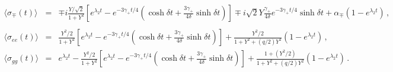 \documentclass[twocolumn,aps,eqsecnum,showkeys,amsmath]{revtex4-2}
\begin{document}
\begin{widetext}
%
%
\begin{subequations} 	\label{eq:BlochSolsApp}
\begin{eqnarray} 	
\langle \sigma_{\mp} (t) \rangle &=& 
	\mp i \frac{ Y/ \sqrt{2} }{1+Y^2}  \left[ e^{\lambda_2 t} 
	 -e^{-3\gamma_+ t/4} \left( \cosh{\delta t}  
	+ \frac{3 \gamma_+}{4 \delta} \sinh{\delta t} \right) \right] 
  \mp i \sqrt{2} Y \frac{\gamma_+}{4 \delta} e^{-3\gamma_+ t/4} \sinh{\delta t}	
  +\alpha_{\mp} \left( 1- e^{\lambda_2 t} \right) \,,  	\nonumber \\   \\
%
\langle \sigma_{ee} (t) \rangle &=& 
	\frac{ Y^2/2 }{1+ Y^2}  \left[ e^{\lambda_2 t} 
	-e^{-3\gamma_+ t/4} \left( \cosh{\delta t}  
	+ \frac{3 \gamma_+}{4 \delta} \sinh{\delta t} \right)    \right] 
  	+\frac{Y^2/ 2}{1+Y^2 +(q/2)Y^2} \left( 1- e^{\lambda_2 t} \right) \,, 		\\ 
%
\langle \sigma_{gg} (t) \rangle &=& e^{\lambda_2 t}
	-\frac{ Y^2/2 }{1+ Y^2}   \left[ e^{\lambda_2 t} 
	-e^{-3\gamma_+ t/4} \left( \cosh{\delta t}  
	+ \frac{3 \gamma_+}{4 \delta} \sinh{\delta t} \right)   \right] 
  	+\frac{1+(Y^2/ 2)}{1+Y^2 +(q/2)Y^2} \left( 1- e^{\lambda_2 t} \right) \,. 	
\end{eqnarray}
\end{subequations} 


\end{widetext}
\end{document}
